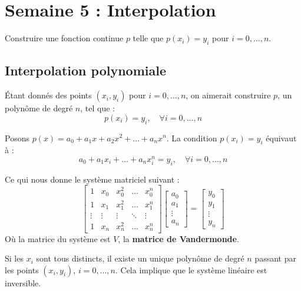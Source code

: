 \section{Semaine 5 : Interpolation}

\begin{explication}
Construire une fonction continue $p$ telle que $p(x_i) = y_i$ pour $i = 0, \dots, n$.
\end{explication}

\subsection{Interpolation polynomiale}

Étant donnés des points $(x_i, y_i)$ pour $i = 0, \dots, n$, on aimerait construire $p$, un polynôme de degré $n$, tel que :
$$p(x_i) = y_i, \quad \forall i = 0, \dots, n$$

Posons $p(x) = a_0 + a_1x + a_2x^2 + \dots + a_nx^n$.
La condition $p(x_i) = y_i$ équivaut à :
$$a_0 + a_1x_i + \dots + a_nx_i^n = y_i, \quad \forall i = 0, \dots, n$$

Ce qui nous donne le système matriciel suivant :
$$
\begin{bmatrix}
1 & x_0 & x_0^2 & \dots & x_0^n \\
1 & x_1 & x_1^2 & \dots & x_1^n \\
\vdots & \vdots & \vdots & \ddots & \vdots \\
1 & x_n & x_n^2 & \dots & x_n^n
\end{bmatrix}
\begin{bmatrix}
a_0 \\
a_1 \\
\vdots \\
a_n
\end{bmatrix}
=
\begin{bmatrix}
y_0 \\
y_1 \\
\vdots \\
y_n
\end{bmatrix}
$$
Où la matrice du système est $V$, la \textbf{matrice de Vandermonde}.

Si les $x_i$ sont tous distincts, il existe un unique polynôme de degré $n$ passant par les points $(x_i, y_i)$, $i=0,\dots,n$. Cela implique que le système linéaire est inversible.

